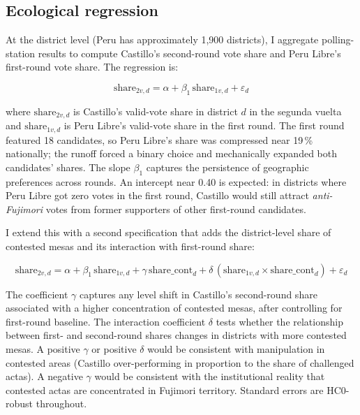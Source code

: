\documentclass[12pt]{article}
\begin{document}
\subsection{Ecological regression}

At the district level (Peru has approximately 1,900 districts), I aggregate
polling-station results to compute Castillo's second-round vote share and
Peru Libre's first-round vote share. The regression is:

\begin{equation}
  \text{share}_{2v,d} = \alpha + \beta_1 \, \text{share}_{1v,d} + \varepsilon_d
  \label{eq:spec1}
\end{equation}

where $\text{share}_{2v,d}$ is Castillo's valid-vote share in district $d$ in
the segunda vuelta and $\text{share}_{1v,d}$ is Peru Libre's valid-vote share
in the first round. The first round featured 18 candidates, so Peru Libre's
share was compressed near 19\,\% nationally; the runoff forced a binary choice
and mechanically expanded both candidates' shares. The slope $\beta_1$ captures
the persistence of geographic preferences across rounds. An intercept near
0.40 is expected: in districts where Peru Libre got zero votes in the first
round, Castillo would still attract \emph{anti-Fujimori} votes from former
supporters of other first-round candidates.

I extend this with a second specification that adds the district-level share
of contested mesas and its interaction with first-round share:

\begin{equation}
  \text{share}_{2v,d} = \alpha + \beta_1 \, \text{share}_{1v,d}
    + \gamma \, \text{share\_cont}_d
    + \delta \, (\text{share}_{1v,d} \times \text{share\_cont}_d)
    + \varepsilon_d
  \label{eq:spec2}
\end{equation}

The coefficient $\gamma$ captures any level shift in Castillo's second-round
share associated with a higher concentration of contested mesas, after
controlling for first-round baseline. The interaction coefficient $\delta$
tests whether the relationship between first- and second-round shares changes
in districts with more contested mesas. A positive $\gamma$ or positive
$\delta$ would be consistent with manipulation in contested areas
(Castillo over-performing in proportion to the share of challenged actas).
A negative $\gamma$ would be consistent with the institutional reality that
contested actas are concentrated in Fujimori territory. Standard errors are
HC0-robust throughout.
\end{document}
